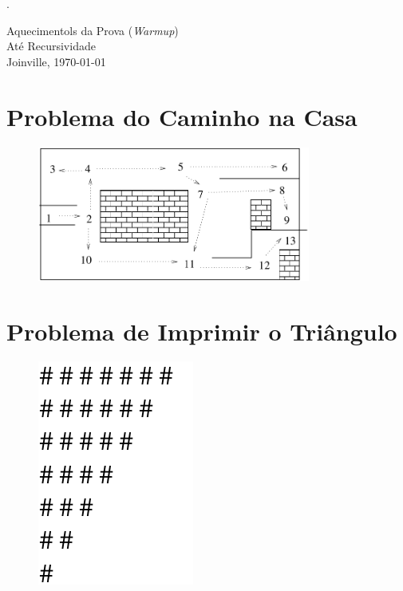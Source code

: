 \documentclass[final,a4paper]{article}
\begin{document}
.


\begin{center}
{\huge
Aquecimentols
 da Prova ({\em Warmup})\\
Até Recursividade\\
Joinville, \today 

}
\end{center}



\section{Problema do Caminho na Casa}

\begin{figure}[!htb]
\centering
\includegraphics[width=0.8\textwidth , height=0.7\textheight]{casa.pdf}
\end{figure}



\section{Problema de Imprimir o Triângulo}


\begin{figure}[!htb]
\centering
\includegraphics[scale=1.3]{triangulo.pdf}
\end{figure}
\end{document}
